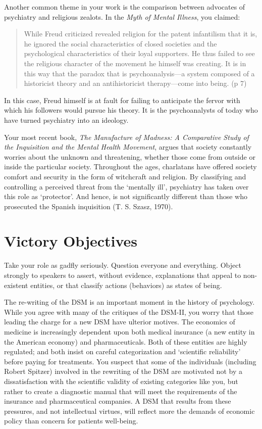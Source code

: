 \begin{refsection}
Another common theme in your work is the comparison between advocates of psychiatry and religious zealots. In the \emph{Myth of Mental Illness}, you claimed:

\begin{quote}

While Freud criticized revealed religion for the patent infantilism that it is, he ignored the social characteristics of closed societies and the psychological characteristics of their loyal supporters. He thus failed to see the religious character of the movement he himself was creating. It is in this way that the paradox that is psychoanalysis—a system composed of a historicist theory and an antihistoricist therapy—come into being. (p 7)
\end{quote}

In this case, Freud himself is at fault for failing to anticipate the fervor with which his followers would pursue his theory. It is the psychoanalysts of today who have turned psychiatry into an ideology.

Your most recent book, \emph{The Manufacture of Madness: A Comparative Study of the Inquisition and the Mental Health Movement}, argues that society constantly worries about the unknown and threatening, whether those come from outside or inside the particular society. Throughout the ages, charlatans have offered society comfort and security in the form of witchcraft and religion. By classifying and controlling a perceived threat from the ‘mentally ill’, psychiatry has taken over this role as ‘protector’. And hence, is not significantly different than those who prosecuted the Spanish inquisition (T. S. Szasz, 1970).

\section{Victory Objectives}
\label{victoryobjectives}

Take your role as gadfly seriously. Question everyone and everything. Object strongly to speakers to assert, without evidence, explanations that appeal to non-existent entities, or that classify actions (behaviors) as states of being.

The re-writing of the DSM is an important moment in the history of psychology. While you agree with many of the critiques of the DSM-II, you worry that those leading the charge for a new DSM have ulterior motives. The economics of medicine is increasingly dependent upon both medical insurance (a new entity in the American economy) and pharmaceuticals. Both of these entities are highly regulated; and both insist on careful categorization and `scientific reliability' before paying for treatments. You suspect that some of the individuals (including Robert Spitzer) involved in the rewriting of the DSM are motivated not by a dissatisfaction with the scientific validity of existing categories like you, but rather to create a diagnostic manual that will meet the requirements of the insurance and pharmaceutical companies. A DSM that results from these pressures, and not intellectual virtues, will reflect more the demands of economic policy than concern for patients well-being.


\end{refsection}
